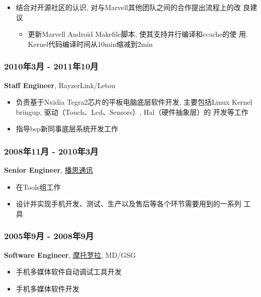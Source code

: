 \documentclass[11pt,dvipdfmx,CJKbookmarks]{article}
\begin{document}
\begin{CJK*}{UTF8}{simsun}
\begin{itemize}
\item 结合对开源社区的认识, 对与Marvell其他团队之间的合作提出流程上的改
良建议

\begin{itemize}
\item 更新Marvell Android Makefile脚本, 使其支持并行编译和ccache的使
用. Kernel代码编译时间从10min缩减到2min
\end{itemize}
\end{itemize}

\subsubsection{2010年3月 - 2011年10月}
\label{sec-1-0-3}

\textbf{Staff Engineer}, RayzerLink/Letou

\begin{itemize}
\item 负责基于Nvidia Tegra2芯片的平板电脑底层软件开发, 主要包括Linux
Kernel bringup, 驱动（Touch、Lcd、Sensors）, Hal（硬件抽象层）的
开发等工作

\item 指导bsp新同事底层系统开发工作
\end{itemize}

\subsubsection{2008年11月 - 2010年3月}
\label{sec-1-0-4}

\textbf{Senior Engineer}, \href{http://www.borqs.com}{播思通讯}

\begin{itemize}
\item 在Tools组工作

\item 设计并实现手机开发、测试、生产以及售后等各个环节需要用到的一系列
工具
\end{itemize}


\subsubsection{2005年9月 - 2008年9月}
\label{sec-1-0-5}

\textbf{Software Engineer}, \href{http://motorola.com}{摩托罗拉},  MD/GSG

\begin{itemize}
\item 手机多媒体软件自动调试工具开发

\item 手机多媒体软件开发
\end{itemize}


\end{CJK*}
\end{document}
